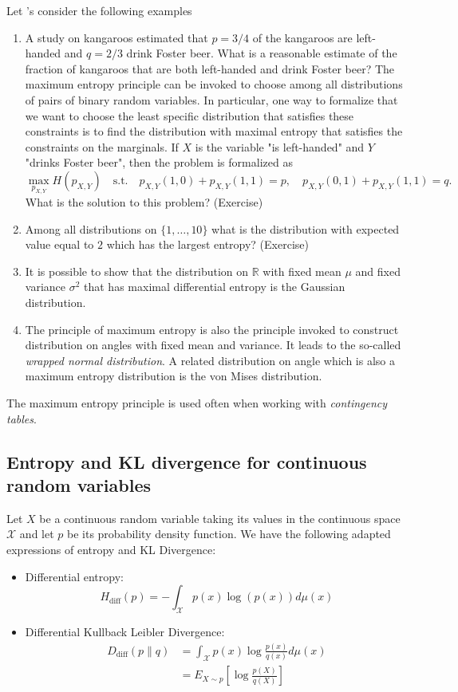 \documentclass[12pt]{report}
\begin{document}
Let 's consider the following examples
\begin{enumerate}
\item A study on kangaroos estimated that $p=3/4$ of the kangaroos are left-handed and $q=2/3$ drink Foster beer. What is a reasonable estimate of the fraction of kangaroos that are both left-handed and drink Foster beer? The maximum entropy principle can be invoked to choose among all distributions of pairs of binary random variables. In particular, one way to formalize that we want to choose the least specific distribution that satisfies these constraints is to find the
distribution with maximal entropy that satisfies the constraints on the marginals.
If $X$ is the variable "is left-handed" and $Y$ "drinks Foster beer", then the problem is formalized as 
$$\max_{p_{X,Y}} H(p_{X,Y}) \quad \text{s.t.} \quad p_{X,Y}(1,0)+p_{X,Y}(1,1)=p, \quad p_{X,Y}(0,1)+p_{X,Y}(1,1)=q.$$
What is the solution to this problem? (Exercise)
\item Among all distributions on $\{1,\ldots,10\}$ what is the distribution with expected value equal to $2$ which has the largest entropy? (Exercise)
\item It is possible to show that the distribution on $\mathbb{R}$ with fixed mean $\mu$ and fixed variance $\sigma^2$ that has maximal differential entropy is the Gaussian distribution.
\item The principle of maximum entropy is also the principle invoked to construct distribution on angles with fixed mean and variance. It leads to the so-called \emph{wrapped normal distribution}. A related distribution on angle which is also a maximum entropy distribution is the von Mises distribution. 
\end{enumerate}
The maximum entropy principle is used often when working with \emph{contingency tables}.

\subsection{Entropy and KL divergence for continuous random variables}
 
Let $X$ be a continuous random variable taking its values in the continuous space $\mathcal{X}$ and let $p$ be its probability density function. We have the following adapted expressions of entropy and KL Divergence:
\begin{itemize}
	\item Differential entropy:
	$$H_{\text{diff}}(p)=-\int_{ \mathcal{X} }{p(x) \log (p(x)) d\mu (x)}$$
	\item Differential Kullback Leibler Divergence:
	$$\begin{aligned}
D_{\text{diff}}(p\parallel q) &= \int_{ \mathcal{X} }{p(x) \log \frac{p(x)}{q(x)} d\mu(x)}\\
&= E_{X\sim p} \left[ \log \frac{p(X)}{q(X)} \right]
\end{aligned}$$
\end{itemize}
\end{document}
